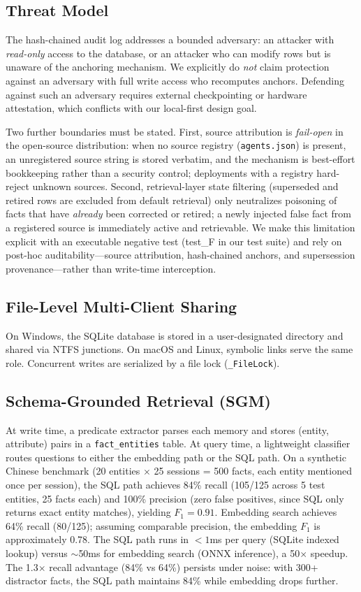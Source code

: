 \documentclass{article}
\begin{document}
\subsection{Threat Model}
\label{sec:threat}
The hash-chained audit log addresses a bounded adversary: an attacker with \emph{read-only} access to the database, or an attacker who can modify rows but is unaware of the anchoring mechanism. We explicitly do \emph{not} claim protection against an adversary with full write access who recomputes anchors. Defending against such an adversary requires external checkpointing or hardware attestation, which conflicts with our local-first design goal.

Two further boundaries must be stated. First, source attribution is \emph{fail-open} in the open-source distribution: when no source registry (\texttt{agents.json}) is present, an unregistered source string is stored verbatim, and the mechanism is best-effort bookkeeping rather than a security control; deployments with a registry hard-reject unknown sources. Second, retrieval-layer state filtering (superseded and retired rows are excluded from default retrieval) only neutralizes poisoning of facts that have \emph{already} been corrected or retired; a newly injected false fact from a registered source is immediately active and retrievable. We make this limitation explicit with an executable negative test (test\_F in our test suite) and rely on post-hoc auditability---source attribution, hash-chained anchors, and supersession provenance---rather than write-time interception.

\subsection{File-Level Multi-Client Sharing}
On Windows, the SQLite database is stored in a user-designated directory and shared via NTFS junctions. On macOS and Linux, symbolic links serve the same role. Concurrent writes are serialized by a file lock (\texttt{\_FileLock}).

\subsection{Schema-Grounded Retrieval (SGM)}
At write time, a predicate extractor parses each memory and stores (entity, attribute) pairs in a \texttt{fact\_entities} table. At query time, a lightweight classifier routes questions to either the embedding path or the SQL path. On a synthetic Chinese benchmark (20 entities $\times$ 25 sessions = 500 facts, each entity mentioned once per session), the SQL path achieves 84\% recall (105/125 across 5 test entities, 25 facts each) and 100\% precision (zero false positives, since SQL only returns exact entity matches), yielding $F_1 = 0.91$. Embedding search achieves 64\% recall (80/125); assuming comparable precision, the embedding $F_1$ is approximately 0.78. The SQL path runs in $< 1$ms per query (SQLite indexed lookup) versus $\sim$50ms for embedding search (ONNX inference), a 50$\times$ speedup. The 1.3$\times$ recall advantage (84\% vs 64\%) persists under noise: with 300+ distractor facts, the SQL path maintains 84\% while embedding drops further.
\end{document}

